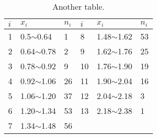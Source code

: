 \begin{table}[htbp]  
\caption{Another table.}  
\begin{center}  
\begin{tabu} to 0.8\textwidth{X[c]|X[3,b]|X[2,l]|X[c]|X[3,m]|X[1,c]}  
\hline  
$i$  &$x_i$              &$n_i$      &$i$    &$x_i$               &$n_i$\\  
    &0.5$\sim$0.64       &1           &8    &1.48$\sim$1.62      &53\\  
2    &0.64$\sim$0.78      &2           &9    &1.62$\sim$1.76      &25\\  
3    &0.78$\sim$0.92      &9           &10   &1.76$\sim$1.90      &19\\  
4    &0.92$\sim$1.06      &26          &11   &1.90$\sim$2.04      &16\\  
5    &1.06$\sim$1.20      &37          &12   &2.04$\sim$2.18      &3\\  
6    &1.20$\sim$1.34      &53          &13   &2.18$\sim$2.38      &1\\  
7    &1.34$\sim$1.48      &56          &     &                    & \\  
\hline  
\end{tabu}  
\end{center}  
\end{table}

